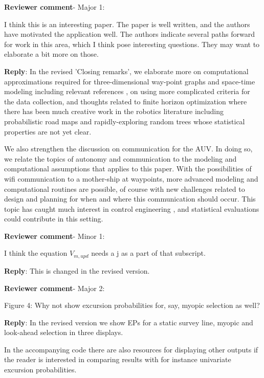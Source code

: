 \documentclass[a4paper]{article}
\def\revcom{\textbf{Reviewer comment}}
\def\reply{\textbf{Reply}}
\begin{document}
\begin{answers}

\item{\revcom - Major 1:}\label{r3c1}

I think this is an interesting paper. The paper is well written, 
and the authors have motivated the application well. 
The authors indicate several paths forward for work in this area, which I think pose interesting questions. They may want to elaborate a bit more on those.

\reply: In the revised 'Closing remarks', we elaborate more on computational approximations required for three-dimensional way-point graphs and space-time modeling including relevant references \citep{sigrist2015stochastic,richardson2017sparsity}, on using more complicated criteria for the data collection, and thoughts related to finite horizon optimization where there has been much creative work in the robotics literature including probabilistic road maps and rapidly-exploring random trees \citep{karaman2011sampling} whose statistical properties are not yet clear.

We also strengthen the discussion on communication for the AUV. In doing so, we relate the topics of autonomy and communication to the modeling and computational assumptions that applies to this paper. With the possibilities of wifi communication to a mother-ship at waypoints, more advanced modeling and computational routines are possible, of course with new challenges related to design and planning for when and where this communication should occur. This topic has caught much interest in control engineering \citep{zolich2019survey}, and statistical evaluations could contribute in this setting.

\item{\revcom - Minor 1:}\label{r3c2}

I think the equation $V_{m,upd}$ needs a j as a part of that subscript.

\reply: This is changed in the revised version.

\item{\revcom - Major 2:}\label{r3c3}

Figure 4: Why not show excursion probabilities for, say, myopic selection as well?

\reply: In the revised version we show EPs for a static survey line, myopic and look-ahead selection in three displays. 

In the accompanying code there are also resources for displaying other outputs if the reader is interested in comparing results with for instance univariate excursion probabilities.

\end{answers}


\footnotesize



\end{document}
